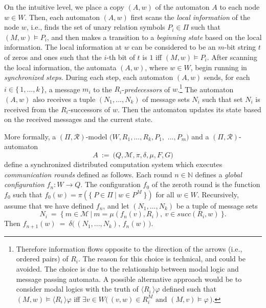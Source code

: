 \documentclass[copyright,creativecommons]{eptcs}
\begin{document}
On the intuitive level, we place a copy $(A,w)$ of the automaton $A$ to each node $w\in W$.
Then, each automaton $(A,w)$  first scans the \emph{local  information} of the node $w$, i.e.,
finds the set of unary relation symbols $P_i\in\Pi$ such that $(M,w)\models P_i$, and then makes a transition to
a \emph{beginning state} based on the local information.
The local information at $w$ can be considered to be an $m$-bit string $t$ of zeros and ones such
that the $i$-th bit of $t$ is $1$ iff $(M,w)\models P_i$.
After scanning the local information, the automata $(A,w)$, where $w\in W$,
begin running in \emph{synchronized steps}. During
each step, each automaton $(A,w)$ sends, for each $i\in\{\, 1,...,k\, \}$, a message $m_i$ to the
$R_i$-\emph{predecessors} of $w$.\hspace{0.4mm}\footnote{Therefore information flows opposite to the direction of
the arrows (i.e., ordered pairs) of $R_i$. The reason for this choice is technical, and could be avoided.
The choice is due to the relationship between modal logic and message passing automata.
A possible alternative approach would be to consider modal logics with the truth of $\langle R_i\, \rangle\varphi$
defined such that $(M,w)\models \langle R_i\, \rangle\varphi$
iff $\exists v\in W\bigl(\, (v,w)\in R_i^M\text{ and }(M,v)\models\varphi\,\bigr)$.}
The automaton $(A,w)$ also receives a tuple $(N_1,...,N_k)$ of message sets $N_i$ such that
set $N_i$ is received from 
the $R_i$-successors of $w$. Then the automaton updates its state based on the received messages and
the current state.




More formally, a $(\Pi,\mathcal{R})$-model $\bigl(W,R_1,...,R_k,P_1,$ $...,P_m\bigr)$
and a $(\Pi,\mathcal{R})$-automaton
$$A\ :=\ \bigl(Q,\mathcal{M},\pi,\delta,\mu,F,G\bigr)$$
define a
synchronized distributed computation system which executes \emph{communication
rounds} defined as follows. Each round $n\in\mathbb{N}$ defines a \emph{global configuration} $f_n:W\rightarrow Q$.
The configuration $f_0$ of the zeroth round is the function $f_0$ such that $f_0(w) = \pi(\{\ P\in\Pi\ |\ w\in P^M\ \})$
for all $w\in W$.
Recursively, assume that we have defined $f_n$,
and let $(N_1,...,N_k)$
be a tuple of message sets 
$$N_i\ =\ \bigl\{\ m\in \mathcal{M}\ |\ m = \mu( f_{n}(v), R_i),\   v\in\mathit{succ}(R_i,w)\ \bigr\}.$$
Then
$f_{n+1}(w)\ =\ \delta\bigl(\, (N_1,...,N_k),\, f_{n}(w)\, \bigr)$.
\end{document}
